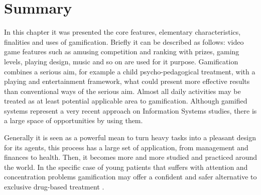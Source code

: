 \section{Summary}

In this chapter it was presented the core features, elementary characteristics, finalities and uses of gamification. Briefly it can be described as follows: video game features such as amusing competition and ranking with prizes, gaming levels, playing design, music and so on are used for it purpose. Gamification combines a serious aim, for example a child psycho-pedagogical treatment, with a playing and entertainment framework, what could present more effective results than conventional ways of the serious aim. Almost all daily activities may be treated as at least potential applicable area to gamification. Although gamified systems represent a very recent approach on Information Systems studies, there is a large space of opportunities by using them.

Generally it is seen as a powerful mean to turn heavy tasks into a pleasant design for its agents, this process has a large set of application, from management and finances to health.  Then, it becomes more and more studied and practiced around the world. In the specific case of young patients that suffers with attention and concentration problems gamification may offer a confident and safer alternative to exclusive drug-based treatment \citep{Nemeth}.